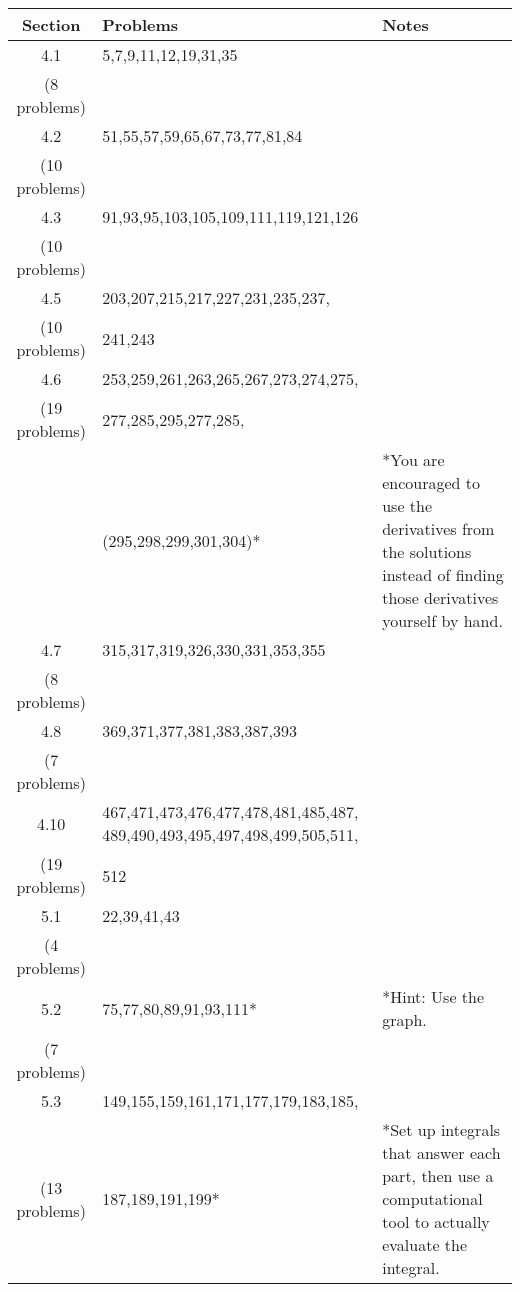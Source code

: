 \documentclass[11pt,fleqn]{article}
\begin{document}
\begin{tabularx}{\textwidth}{|c|| X | X | }
\hline
Section&Problems& Notes \\
\hline \hline
4.1&5,7,9,11,12,19,31,35& \\
(8 problems)&& \\ \hline

4.2&51,55,57,59,65,67,73,77,81,84& \\
(10 problems)&& \\ \hline

4.3&91,93,95,103,105,109,111,119,121,126& \\
(10 problems)&& \\ \hline

4.5&203,207,215,217,227,231,235,237,& \\
(10 problems)&241,243& \\ \hline

4.6&253,259,261,263,265,267,273,274,275,& \\
(19 problems) &277,285,295,277,285,& \\
&(295,298,299,301,304)*&*You are encouraged to use the derivatives from the solutions instead of finding those derivatives yourself by hand.\\ \hline

4.7&315,317,319,326,330,331,353,355& \\
(8 problems)&& \\ \hline

4.8&369,371,377,381,383,387,393& \\
(7 problems) && \\ \hline

4.10&467,471,473,476,477,478,481,485,487, 489,490,493,495,497,498,499,505,511,& \\
(19 problems)&512& \\ \hline \hline

5.1&22,39,41,43& \\ 
(4 problems)&& \\ \hline

5.2&75,77,80,89,91,93,111*&*Hint: Use the graph. \\ 
(7 problems)&& \\ \hline

5.3&149,155,159,161,171,177,179,183,185,& \\ 
(13 problems)&187,189,191,199*&*Set up integrals that answer each part, then use a computational tool to actually evaluate the integral.\\ \hline


\end{tabularx}
\end{document}
